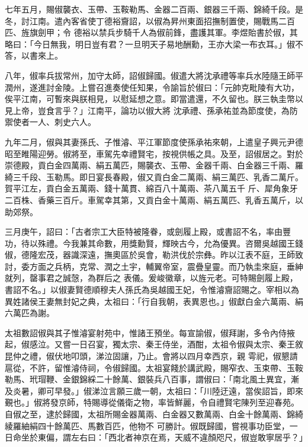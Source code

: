 \begin{pinyinscope}
 七年五月，賜俶襲衣、玉帶、玉鞍勒馬、金器二百兩、銀器三千兩、錦綺千段。是冬，討江南。遣內客省使丁德裕齎詔，以俶為昇州東面招撫制置使，賜戰馬二百匹、旌旗劍甲；令
 德裕以禁兵步騎千人為俶前鋒，盡護其軍。李煜貽書於俶，其略曰：「今日無我，明日豈有君？一旦明天子易地酬勳，王亦大梁一布衣耳。」俶不答，以書來上。



 八年，俶率兵拔常州，加守太師，詔俶歸國。俶遣大將沈承禮等率兵水陸隨王師平潤州，遂進討金陵。上嘗召進奏使任知果，令諭旨於俶曰：「元帥克毗陵有大功，俟平江南，可暫來與朕相見，以慰延想之意。即當遣還，不久留也。朕三執圭幣以見上帝，豈食言乎？」江南平，論功以俶大將
 沈承禮、孫承祐並為節度使，為防禦使者一人、刺史六人。



 九年二月，俶與其妻孫氏、子惟濬、平江軍節度使孫承祐來朝，上遣皇子興元尹德昭至睢陽迎勞。俶將至，車駕先幸禮賢宅，按視供帳之具。及至，詔俶居之。對於崇德殿，貢白金四萬兩、絹五萬匹，賜襲衣、玉帶、金器千兩、白金器三千兩、羅綺三千段、玉勒馬。即日宴長春殿，俶又貢白金二萬兩、絹三萬匹、乳香二萬斤。賀平江左，貢白金五萬兩、錢十萬貫、綿百八十萬兩、茶八萬五千
 斤、犀角象牙二百株、香藥三百斤。車駕幸其第，又貢白金十萬兩、絹五萬匹、乳香五萬斤，以助郊祭。



 三月庚午，詔曰：「古者宗工大臣特被隆眷，或劍履上殿，或書詔不名，率由豐功，待以殊禮。今我兼其命數，用獎勳賢，輝映古今，允為優異。咨爾吳越國王錢俶，德隆宏茂，器識深遠，撫奧區於吳會，勒洪伐於宗彝。昨以江表不庭，王師致討，委方面之兵柄，克常、潤之土宇，輔翼帝室，震疊皇靈。而乃執圭來庭，垂紳就列，罄事君之誠愨，為群后之
 表儀。爰峻徽章，以旌元老。可特賜劍履上殿，書詔不名。」以俶妻賢德順穆夫人孫氏為吳越國王妃，令惟濬齎詔賜之。宰相以為異姓諸侯王妻無封妃之典，太祖曰：「行自我朝，表異恩也。」俶獻白金六萬兩、絹六萬匹為謝。



 太祖數詔俶與其子惟濬宴射苑中，惟諸王預坐。每宣諭俶，俶拜謝，多令內侍掖起，俶感泣。又嘗一日召宴，獨太宗、秦王侍坐，酒酣，太祖令俶與太宗、秦王敘昆仲之禮，俶伏地叩頭，涕泣固讓，乃止。會將以四月幸西京，親
 雩祀，俶懇請扈從，不許，留惟濬侍祠，令俶歸國。太祖宴餞於講武殿，賜窄衣、玉束帶、玉鞍勒馬、玳瑁鞭、金銀錦綵二十餘萬、銀裝兵八百事，謂俶曰：「南北風土異宜，漸及炎暑，卿可早發。」俶涕泣言願三歲一朝，太祖曰：「川陸迂遠，當俟詔旨，即來覲也。」俶將發京師，特賜導從儀衛之物，率皆鮮麗，令自禮賢宅陳列至迎春苑。自俶之至，逮於歸國，太祖所賜金器萬兩、白金器又數萬兩、白金十餘萬兩、錦綺綾羅紬絹四十餘萬匹、馬數百匹，他物不
 可勝計。俶既歸國，嘗視事功臣堂，一日命坐於東偏，謂左右曰：「西北者神京在焉，天威不違顏咫尺，俶豈敢寧居乎？」




\end{pinyinscope}
